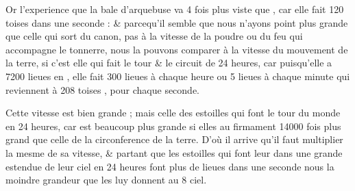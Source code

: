 \documentclass[11pt,a4paper]{article}
\begin{document}
Or l'experience  que la bale d'arquebuse va \struck{\ill{}} 4 fois plus viste que  , car elle fait 120 toises dans une seconde : \& parcequ'il semble que nous n'ayons point  plus grande que celle qui sort du   canon, \struck{\ill{}} \add{\ill{}}    pas à la vitesse  de la poudre ou du feu qui accompagne le tonnerre, nous la pouvons comparer à la vitesse du mouvement de la terre, si c'est elle qui fait le tour \& le circuit de 24 heures, car puisqu'elle a 7200 lieues en , elle fait 300 lieues à chaque heure ou 5 lieues à chaque minute qui reviennent à 208 toises \struck{\ill{}} , pour chaque seconde.

Cette vitesse est bien grande ; mais celle des estoilles \struck{\ill{}} qui font le tour du monde en 24 heures, car  \struck{\ill{}} est beaucoup plus grande si elles  au firmament 14000 fois plus grand que celle de la circonference de la terre. D'où il arrive qu'il faut multiplier la mesme  de sa vitesse, \& partant que les estoilles qui font leur  dans une  grande estendue de leur ciel en 24 heures font plus de   lieues dans une seconde  nous  la moindre grandeur que les  luy donnent au 8 ciel.

\end{document}
